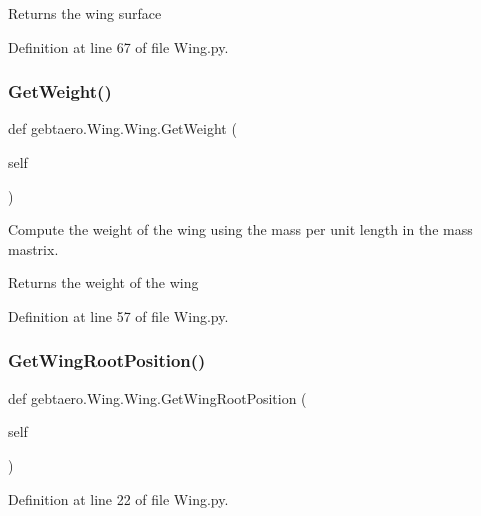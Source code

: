 \begin{DoxyReturn}{Returns}
the wing surface 
\end{DoxyReturn}


Definition at line 67 of file Wing.\+py.

\mbox{\label{classgebtaero_1_1_wing_1_1_wing_a290d5e1d3a18de515339ffbed0f0df35}} 
\subsubsection{\texorpdfstring{Get\+Weight()}{GetWeight()}}
{\footnotesize\ttfamily def gebtaero.\+Wing.\+Wing.\+Get\+Weight (\begin{DoxyParamCaption}\item[{}]{self }\end{DoxyParamCaption})}



Compute the weight of the wing using the mass per unit length in the mass mastrix. 

\begin{DoxyReturn}{Returns}
the weight of the wing 
\end{DoxyReturn}


Definition at line 57 of file Wing.\+py.

\mbox{\label{classgebtaero_1_1_wing_1_1_wing_a6623e4ea917c8a03a3de9bbf7110e754}} 
\subsubsection{\texorpdfstring{Get\+Wing\+Root\+Position()}{GetWingRootPosition()}}
{\footnotesize\ttfamily def gebtaero.\+Wing.\+Wing.\+Get\+Wing\+Root\+Position (\begin{DoxyParamCaption}\item[{}]{self }\end{DoxyParamCaption})}



Definition at line 22 of file Wing.\+py.

